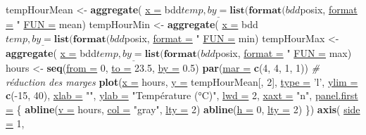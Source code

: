 \documentclass[twoside,symmetric]{book}
\newenvironment{Shaded}{}{}
\newcommand{\CommentTok}[1]{\textit{#1}}
\newcommand{\DataTypeTok}[1]{\underline{#1}}
\newcommand{\DecValTok}[1]{#1}
\newcommand{\FloatTok}[1]{#1}
\newcommand{\KeywordTok}[1]{\textbf{#1}}
\newcommand{\NormalTok}[1]{#1}
\newcommand{\OperatorTok}[1]{#1}
\newcommand{\StringTok}[1]{#1}
\begin{document}
\begin{Shaded}
\begin{Highlighting}[]
\NormalTok{tempHourMean <-}\StringTok{ }\KeywordTok{aggregate}\NormalTok{(}
  \DataTypeTok{x =}\NormalTok{ bdd}\OperatorTok{$}\NormalTok{temp, }
  \DataTypeTok{by =} \KeywordTok{list}\NormalTok{(}\KeywordTok{format}\NormalTok{(bdd}\OperatorTok{$}\NormalTok{posix, }\DataTypeTok{format =} \StringTok{"%
  \DataTypeTok{FUN =}\NormalTok{ mean)}
\NormalTok{tempHourMin <-}\StringTok{ }\KeywordTok{aggregate}\NormalTok{(}
  \DataTypeTok{x =}\NormalTok{ bdd}\OperatorTok{$}\NormalTok{temp, }
  \DataTypeTok{by =} \KeywordTok{list}\NormalTok{(}\KeywordTok{format}\NormalTok{(bdd}\OperatorTok{$}\NormalTok{posix, }\DataTypeTok{format =} \StringTok{"%
  \DataTypeTok{FUN =}\NormalTok{ min)}
\NormalTok{tempHourMax <-}\StringTok{ }\KeywordTok{aggregate}\NormalTok{(}
  \DataTypeTok{x =}\NormalTok{ bdd}\OperatorTok{$}\NormalTok{temp, }
  \DataTypeTok{by =} \KeywordTok{list}\NormalTok{(}\KeywordTok{format}\NormalTok{(bdd}\OperatorTok{$}\NormalTok{posix, }\DataTypeTok{format =} \StringTok{"%
  \DataTypeTok{FUN =}\NormalTok{ max)}
\NormalTok{hours <-}\StringTok{ }\KeywordTok{seq}\NormalTok{(}\DataTypeTok{from =} \DecValTok{0}\NormalTok{, }\DataTypeTok{to =} \FloatTok{23.5}\NormalTok{, }\DataTypeTok{by =} \FloatTok{0.5}\NormalTok{)}
\KeywordTok{par}\NormalTok{(}\DataTypeTok{mar =} \KeywordTok{c}\NormalTok{(}\DecValTok{4}\NormalTok{, }\DecValTok{4}\NormalTok{, }\DecValTok{1}\NormalTok{, }\DecValTok{1}\NormalTok{)) }\CommentTok{# réduction des marges}
\KeywordTok{plot}\NormalTok{(}\DataTypeTok{x =}\NormalTok{ hours, }
    \DataTypeTok{y =}\NormalTok{ tempHourMean[, }\DecValTok{2}\NormalTok{], }\DataTypeTok{type =} \StringTok{'l'}\NormalTok{, }\DataTypeTok{ylim =} \KeywordTok{c}\NormalTok{(}\OperatorTok{-}\DecValTok{15}\NormalTok{, }\DecValTok{40}\NormalTok{), }
    \DataTypeTok{xlab =} \StringTok{""}\NormalTok{, }\DataTypeTok{ylab =} \StringTok{"Température (°C)"}\NormalTok{, }\DataTypeTok{lwd =} \DecValTok{2}\NormalTok{, }
    \DataTypeTok{xaxt =} \StringTok{"n"}\NormalTok{, }\DataTypeTok{panel.first =}\NormalTok{ \{}
        \KeywordTok{abline}\NormalTok{(}\DataTypeTok{v =}\NormalTok{ hours, }\DataTypeTok{col =} \StringTok{"gray"}\NormalTok{, }\DataTypeTok{lty =} \DecValTok{2}\NormalTok{)}
        \KeywordTok{abline}\NormalTok{(}\DataTypeTok{h =} \DecValTok{0}\NormalTok{, }\DataTypeTok{lty =} \DecValTok{2}\NormalTok{)  }
\NormalTok{    \})}
\KeywordTok{axis}\NormalTok{(}
  \DataTypeTok{side =} \DecValTok{1}\NormalTok{, }
}}}
\end{Highlighting}
\end{Shaded}
\end{document}

